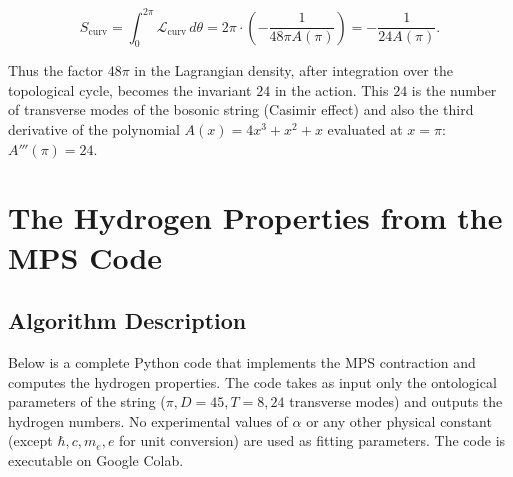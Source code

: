\documentclass[12pt]{article}
\begin{document}
\[
S_{\text{curv}} = \int_0^{2\pi} \mathcal{L}_{\text{curv}} \, d\theta
= 2\pi \cdot \left(-\frac{1}{48\pi A(\pi)}\right)
= -\frac{1}{24A(\pi)}. \tag{9}
\]

Thus the factor \(48\pi\) in the Lagrangian density, after integration over the topological cycle, becomes the invariant \(24\) in the action. This \(24\) is the number of transverse modes of the bosonic string (Casimir effect) and also the third derivative of the polynomial \(A(x) = 4x^3 + x^2 + x\) evaluated at \(x = \pi\): \(A'''(\pi) = 24\).

\section{The Hydrogen Properties from the MPS Code}

\subsection{Algorithm Description}

Below is a complete Python code that implements the MPS contraction and computes the hydrogen properties. The code takes as input only the ontological parameters of the string (\(\pi, D=45, T=8, 24\) transverse modes) and outputs the hydrogen numbers. No experimental values of \(\alpha\) or any other physical constant (except \(\hbar, c, m_e, e\) for unit conversion) are used as fitting parameters. The code is executable on Google Colab.
\end{document}
